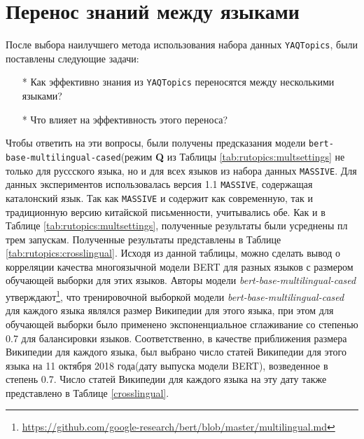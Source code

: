 \section{Перенос знаний между языками}
После выбора наилучшего метода использования набора данных \texttt{YAQTopics}, были поставлены следующие задачи:
\begin{itemize}
\item[*]Как эффективно знания из \texttt{YAQTopics} переносятся между несколькими языками?
\item[*]Что влияет на эффективность этого переноса?
\end{itemize}
Чтобы ответить на эти вопросы, были получены предсказания модели \texttt{bert-base-multilingual-cased}(режим \textbf{Q} из Таблицы \ref{tab:rutopics:multsettings} не только для руссского языка, но и для всех языков из набора данных \texttt{MASSIVE}. Для данных экспериментов использовалась версия 1.1 \texttt{MASSIVE}, содержащая каталонский язык. Так как \texttt{MASSIVE} и содержит как современную, так и традиционную версию китайской письменности, учитывались обе. Как и в Таблице \ref{tab:rutopics:multsettings}, полученные результаты были усреднены пл трем запускам.
Полученные результаты представлены в Таблице \ref{tab:rutopics:crosslingual}. Исходя из данной таблицы, можно сделать вывод о корреляции качества многоязычной модели BERT для разных языков с размером обучающей выборки для этих языков. Авторы модели \textit{bert-base-multilingual-cased} утверждают\footnote{\url{https://github.com/google-research/bert/blob/master/multilingual.md}}, что тренировочной выборкой модели \textit{bert-base-multilingual-cased} для каждого языка являлся размер Википедии для этого языка, при этом для обучающей выборки было применено экспоненциальное сглаживание со степенью 0.7 для балансировки языков.
Соответственно, в качестве приближения размера Википедии для каждого языка, был выбрано число статей Википедии для этого языка на 11 октября 2018 года(дату выпуска модели BERT), возведенное в степень 0.7.  Число статей Википедии для каждого языка на эту дату также представлено в Таблице \ref{crosslingual}.

